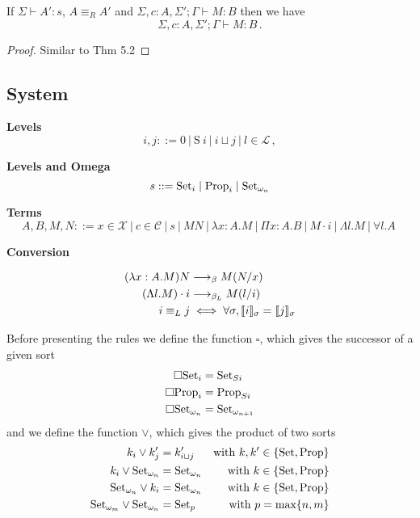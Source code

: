\documentclass[]{StandardTemplate}
\begin{document}
\begin{thm}[]
If $ \Sigma \vdash A' : s $, $ A \equiv_R A' $ and $ \Sigma, c : A, \Sigma'; \Gamma \vdash M : B $ then we have \[
\Sigma, c : A, \Sigma'; \Gamma \vdash M : B 
\,.\]
\end{thm}
\begin{proof}
Similar to Thm 5.2
\end{proof}

\subsection{System}
\label{subsec:label}




\newcommand{\ctx}{{\Sigma;\Theta;\Gamma}}

\textbf{Levels}
\[
i, j ::= 0~|~\text{S}~i~|~i \sqcup j~|~l \in \mathcal{L}\,,
\]

\textbf{Levels and Omega}
\[
s ::= \text{Set}_i \mid \text{Prop}_i \mid \text{Set}_{\omega_n}
\]

\textbf{Terms}
\[
A, B, M, N ::= x \in \mathcal{X}~|~c \in \mathcal{C}~|~s~|~M N~|~\lambda x : A . M~|~\Pi x : A. B~|~M \cdot i~|~\Lambda l. M~|~\forall l. A~
\]

\textbf{Conversion}

\begin{align*}
  (\lambda x : A. M) N &\longrightarrow_\beta M (N/x)\\
  (\Lambda l. M) \cdot i &\longrightarrow_{\beta_L} M (l/i)\\
  i \equiv_L j &\iff \forall \sigma, \llbracket i \rrbracket_\sigma = \llbracket j \rrbracket_\sigma
\end{align*}

Before presenting the rules we define the function $ \square$, which gives the successor of a given sort
\begin{align*}
  \square \text{Set}_i &= \text{Set}_{S i}\\
  \square \text{Prop}_i &= \text{Prop}_{S i}\\
  \square \text{Set}_{\omega_n} &= \text{Set}_{\omega_{n+1}}
\end{align*}
and we define the function $ \lor $, which gives the product of two sorts
\begin{align*}
  k_i \lor k'_j &= k'_{i \sqcup j} & \text{with } k, k' \in \{\text{Set}, \text{Prop}\}\\
  k_i \lor \text{Set}_{\omega_n} &= \text{Set}_{\omega_n} & \text{with } k \in \{\text{Set},\text{Prop}\}\\
  \text{Set}_{\omega_n} \lor k_i &= \text{Set}_{\omega_n} & \text{with } k \in \{\text{Set},\text{Prop}\}\\  \text{Set}_{\omega_m} \lor \text{Set}_{\omega_n} &= \text{Set}_p & \text{with } p = \text{max}\{n,m\}
\end{align*}
\end{document}
